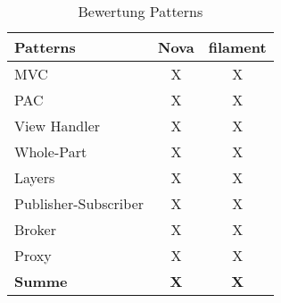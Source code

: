 \begin{table}[]
    \caption{Bewertung Patterns}
    \label{tab:bewertung-patterns}
    \centering
    \begin{tabular}{|l|c|c|}
        \hline
        \textbf{Patterns}    & \textbf{Nova} & \textbf{filament} \\ \hline
        MVC                  & X             & X                 \\ \hline
        PAC                  & X             & X                 \\ \hline
        View Handler         & X             & X                 \\ \hline
        Whole-Part           & X             & X                 \\ \hline
        Layers               & X             & X                 \\ \hline
        Publisher-Subscriber & X             & X                 \\ \hline
        Broker               & X             & X                 \\ \hline
        Proxy                & X             & X                 \\ \hline
        \textbf{Summe}       & \textbf{X}    & \textbf{X}        \\ \hline
    \end{tabular}
\end{table}
\color{black}
